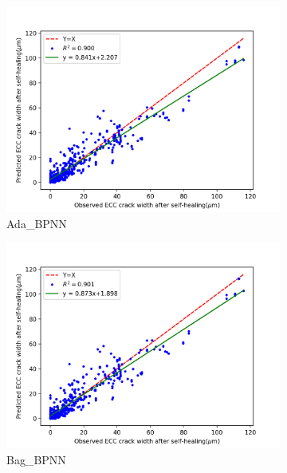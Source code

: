 \documentclass[11pt]{article}
\begin{document}
\begin{figure}[!h]
\begin{subfigure}{0.35\textwidth}
		    \includegraphics[width = \linewidth]{02Ada_BPNN.png}
		    \caption{Ada\_BPNN}
		    \end{subfigure}%
		\hspace{-1.4em}
		    \begin{subfigure}{0.35\textwidth}
		    \centering
		    \includegraphics[width = \linewidth]{02Bag_BPNN.png}
		    \caption{Bag\_BPNN}
		    \end{subfigure}%
		\hspace{-1.4em}
		    \begin{subfigure}{.35\textwidth}
			\centering

\end{subfigure}
\end{figure}
\end{document}
